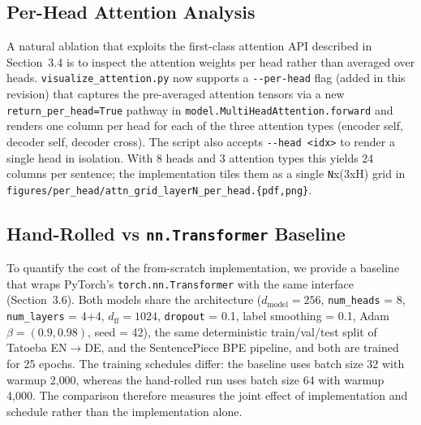 \subsection{Per-Head Attention Analysis}

A natural ablation that exploits the first-class attention API described in Section~3.4 is to inspect the attention weights per head rather than averaged over heads. \texttt{visualize\_attention.py} now supports a \texttt{-{}-per-head} flag (added in this revision) that captures the pre-averaged attention tensors via a new \texttt{return\_per\_head=True} pathway in \texttt{model.MultiHeadAttention.forward} and renders one column per head for each of the three attention types (encoder self, decoder self, decoder cross). The script also accepts \texttt{-{}-head <idx>} to render a single head in isolation. With 8 heads and 3 attention types this yields 24 columns per sentence; the implementation tiles them as a single \texttt{N}x(3xH) grid in \texttt{figures/per\_head/attn\_grid\_layer{N}\_per\_head.\{pdf,png\}}.

\subsection{Hand-Rolled vs \texttt{nn.Transformer} Baseline}

To quantify the cost of the from-scratch implementation, we provide a baseline that wraps PyTorch's \texttt{torch.nn.Transformer} with the same interface (Section~3.6). Both models share the architecture ($d_{\text{model}} = 256$, \texttt{num\_heads} = 8, \texttt{num\_layers} = 4+4, $d_{\text{ff}} = 1024$, \texttt{dropout} = 0.1, label smoothing = 0.1, Adam $\beta = (0.9, 0.98)$, seed = 42), the same deterministic train/val/test split of Tatoeba EN$\rightarrow$DE, and the SentencePiece BPE pipeline, and both are trained for 25 epochs. The training schedules differ: the baseline uses batch size 32 with warmup 2{,}000, whereas the hand-rolled run uses batch size 64 with warmup 4{,}000. The comparison therefore measures the joint effect of implementation and schedule rather than the implementation alone.

